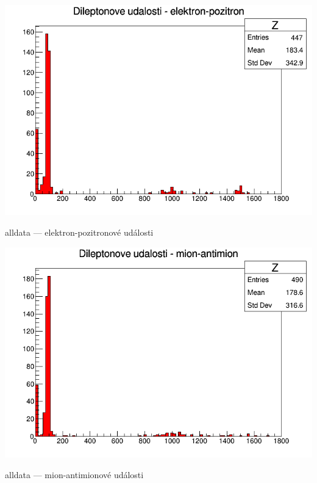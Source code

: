 \begin{graph}[htbp]
\centering
\includegraphics[width=\textwidth-2cm]{graficos/alldataz/c1_n5.png}
\caption{alldata --- elektron-pozitronové události}
\label{o:a2}
\end{graph}

\begin{graph}[htbp]
\centering
\includegraphics[width=\textwidth-2cm]{graficos/alldataz/c1_n6.png}
\caption{alldata --- mion-antimionové události}
\label{o:a3}
\end{graph}

